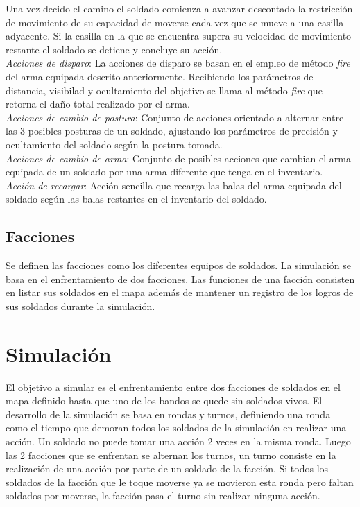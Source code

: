 \documentclass{llncs}
\begin{document}
Una vez decido el camino el soldado comienza a avanzar descontado la restricci\'on de movimiento de su capacidad de moverse cada vez que se mueve a una casilla adyacente. Si la casilla en la que se encuentra supera su velocidad de movimiento restante el soldado se detiene y concluye su acci\'on.\\

\emph{Acciones de disparo}: La acciones de disparo se basan en el empleo de m\'etodo \emph{fire} del arma equipada descrito anteriormente. Recibiendo los par\'ametros de distancia, visibilad y ocultamiento del objetivo se llama al m\'etodo \emph{fire} que retorna el da\~no total realizado por el arma.\\

\emph{Acciones de cambio de postura}: Conjunto de acciones orientado a alternar entre las 3 posibles posturas de un soldado, ajustando los par\'ametros de precisi\'on y ocultamiento del soldado seg\'un la postura tomada.\\

\emph{Acciones de cambio de arma}: Conjunto de posibles acciones que cambian el arma equipada de un soldado por una arma diferente que tenga en el inventario.\\

\emph{Acci\'on de recargar}: Acci\'on sencilla que recarga las balas del arma equipada del soldado seg\'un las balas restantes en el inventario del soldado.
 
\section{Facciones}

Se definen las facciones como los diferentes equipos de soldados. La simulaci\'on se basa en el enfrentamiento de dos facciones. Las funciones de una facci\'on consisten en listar sus soldados en el mapa adem\'as de mantener un registro de los logros de sus soldados durante la simulaci\'on.

 
\chapter{Simulaci\'on}

El objetivo a simular es el enfrentamiento entre dos facciones de soldados en el mapa definido hasta que uno de los bandos se quede sin soldados vivos. El desarrollo de la simulaci\'on se basa en rondas y turnos, definiendo una ronda como el tiempo que demoran todos los soldados de la simulaci\'on en realizar una acci\'on. Un soldado no puede tomar una acci\'on 2 veces en la misma ronda. Luego las 2 facciones que se enfrentan se alternan los turnos, un turno consiste en la realizaci\'on de una acci\'on por parte de un soldado de la facci\'on. Si todos los soldados de la facci\'on que le toque moverse ya se movieron esta ronda pero faltan soldados por moverse, la facci\'on pasa el turno sin realizar ninguna acci\'on.
\end{document}
